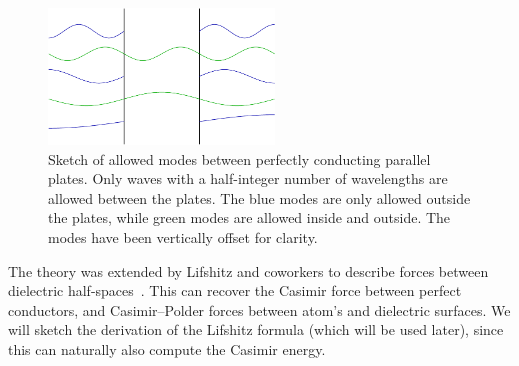 \begin{figure}
\center
\includegraphics[width=6cm]{fig/intro/twoplanes_wave}
\caption[Allowed modes between parallel plates]
{Sketch of allowed modes between perfectly conducting parallel plates. 
 Only waves with a half-integer number of wavelengths are allowed between the plates.
The blue modes are only allowed outside the plates, while green modes are allowed inside
and outside.  The modes have been vertically offset for clarity.  }
\label{fig:Casimir_sketch}
\end{figure}

The theory was extended by Lifshitz and coworkers to describe forces between dielectric half-spaces~\cite{Lifshitz1956,
Dzyaloshinskii1959,Dzyaloshinskii1961}.  This can recover the Casimir force between 
perfect conductors, and Casimir--Polder forces between atom's and dielectric surfaces.  
We will sketch the derivation of the Lifshitz formula (which will be used later),
since this can naturally also compute the Casimir energy.



